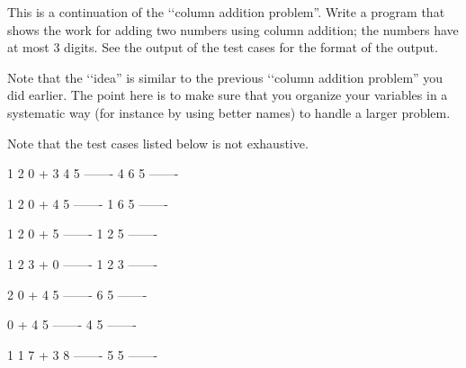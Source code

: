 This is a continuation of the 
\lq\lq column addition problem''. 
Write a program that shows the work 
for adding two numbers using column addition; the numbers have at most 3 
digits.
See the output of the test cases for the format of the output. 

Note that the \lq\lq idea'' 
is similar to the previous \lq\lq column addition problem'' 
you did earlier. 
The point here is to make sure that you organize your variables in a 
systematic way (for instance by using better names) to handle a 
larger problem. 

Note that the test cases listed below is not exhaustive.

\resett
\nextt
\begin{console}[commandchars=\\\{\}]
  1 2 0
+ 3 4 5
-------
  4 6 5    
-------
\end{console}

\nextt
\begin{console}[commandchars=\\\{\}]
  1 2 0
+   4 5
-------
  1 6 5    
-------
\end{console}

\nextt
\begin{console}[commandchars=\\\{\}]
  1 2 0
+     5
-------
  1 2 5    
-------
\end{console}

\nextt
\begin{console}[commandchars=\\\{\}]
  1 2 3
+     0
-------
  1 2 3    
-------
\end{console}

\nextt
\begin{console}[commandchars=\\\{\}]
    2 0
+   4 5
-------
    6 5    
-------
\end{console}

\nextt
\begin{console}[commandchars=\\\{\}]
      0
+   4 5
-------
    4 5    
-------
\end{console}

\nextt
\begin{console}[commandchars=\\\{\}]
    1
    1 7
+   3 8
-------
    5 5     
-------
\end{console}

